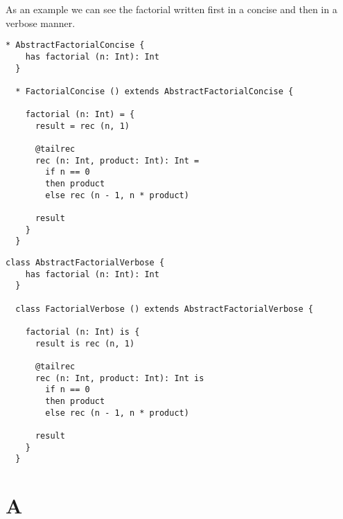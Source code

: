 \documentclass[12pt,a4paper]{book}
\begin{document}
    As an example we can see the factorial written first in a concise and then in a verbose manner.

    \begin{lstlisting}[label={lst:exampleFactorialConcise}]
  * AbstractFactorialConcise {
    has factorial (n: Int): Int
  }

  * FactorialConcise () extends AbstractFactorialConcise {

    factorial (n: Int) = {
      result = rec (n, 1)

      @tailrec
      rec (n: Int, product: Int): Int =
        if n == 0
        then product
        else rec (n - 1, n * product)

      result
    }
  }
    \end{lstlisting}


    \begin{lstlisting}[label={lst:exampleFactorialVerbose}]
  class AbstractFactorialVerbose {
    has factorial (n: Int): Int
  }

  class FactorialVerbose () extends AbstractFactorialVerbose {

    factorial (n: Int) is {
      result is rec (n, 1)

      @tailrec
      rec (n: Int, product: Int): Int is
        if n == 0
        then product
        else rec (n - 1, n * product)

      result
    }
  }
    \end{lstlisting}

    \appendix


    \chapter{A}
\end{document}
